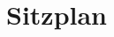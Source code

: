 \documentclass[landscape]{scrartcl}
\title{Sitzplan}
\begin{document}
\tucsInitSeating
\tucsDrawSeating
\end{document}
